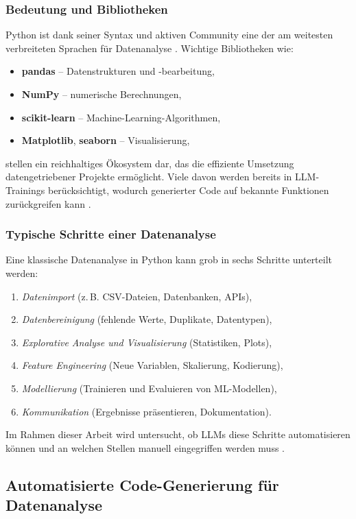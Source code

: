 \documentclass[11pt,a4paper]{article}
\begin{document}
\subsubsection{Bedeutung und Bibliotheken}
Python ist dank seiner Syntax und aktiven Community eine der am weitesten verbreiteten Sprachen für Datenanalyse \cite{wang2021codet5identifierawareunifiedpretrained}. Wichtige Bibliotheken wie:
\begin{itemize}
    \item \textbf{pandas} -- Datenstrukturen und -bearbeitung,
    \item \textbf{NumPy} -- numerische Berechnungen,
    \item \textbf{scikit-learn} -- Machine-Learning-Algorithmen,
    \item \textbf{Matplotlib}, \textbf{seaborn} -- Visualisierung,
\end{itemize}
stellen ein reichhaltiges Ökosystem dar, das die effiziente Umsetzung datengetriebener Projekte ermöglicht. Viele davon werden bereits in LLM-Trainings berücksichtigt, wodurch generierter Code auf bekannte Funktionen zurückgreifen kann \cite{evalplus}.

\subsubsection{Typische Schritte einer Datenanalyse}
Eine klassische Datenanalyse in Python kann grob in sechs Schritte unterteilt werden:
\begin{enumerate}
    \item \textit{Datenimport} (z.\,B. CSV-Dateien, Datenbanken, APIs),
    \item \textit{Datenbereinigung} (fehlende Werte, Duplikate, Datentypen),
    \item \textit{Explorative Analyse und Visualisierung} (Statistiken, Plots),
    \item \textit{Feature Engineering} (Neue Variablen, Skalierung, Kodierung),
    \item \textit{Modellierung} (Trainieren und Evaluieren von ML-Modellen),
    \item \textit{Kommunikation} (Ergebnisse präsentieren, Dokumentation).
\end{enumerate}
Im Rahmen dieser Arbeit wird untersucht, ob LLMs diese Schritte automatisieren können und an welchen Stellen manuell eingegriffen werden muss \cite{chen2021evaluatinglargelanguagemodels,evalplus}.

\subsection{Automatisierte Code-Generierung für Datenanalyse}
\label{sec:AutoCode}
\end{document}
